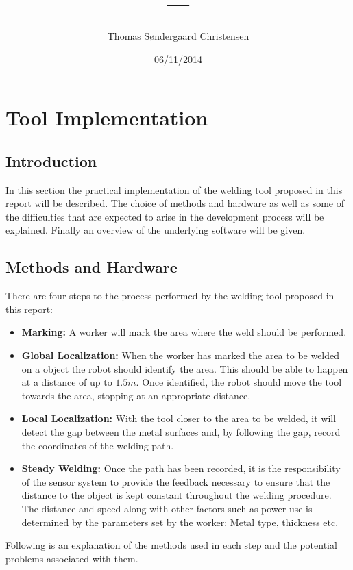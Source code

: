 \documentclass[11pt,a4paper]{article}
\author{Thomas Søndergaard Christensen}
\title{---}
\date{06/11/2014}
\begin{document}
\section{Tool Implementation}
\subsection{Introduction}
In this section the practical implementation of the welding tool proposed in this report will be described. The choice of methods and hardware as well as some of the difficulties that are expected to arise in the development process will be explained. Finally an overview of the underlying software will be given.
\subsection{Methods and Hardware}
There are four steps to the process performed by the welding tool proposed in this report:
\begin{itemize}
	\item \textbf{Marking:} A worker will mark the area where the weld should be performed.
	\item \textbf{Global Localization:} When the worker has marked the area to be welded on a object the robot should identify the area. This should be able to happen at a distance of up to $1.5m$. Once identified, the robot should move the tool towards the area, stopping at an appropriate distance.
	\item \textbf{Local Localization:} With the tool closer to the area to be welded, it will detect the gap between the metal surfaces and, by following the gap, record the coordinates of the welding path.
	\item \textbf{Steady Welding:} Once the path has been recorded, it is the responsibility of the sensor system to provide the feedback necessary to ensure that the distance to the object is kept constant throughout the welding procedure. The distance and speed along with other factors such as power use is determined by the parameters set by the worker: Metal type, thickness etc.
\end{itemize}
Following is an explanation of the methods used in each step and the potential problems associated with them.
\end{document}
